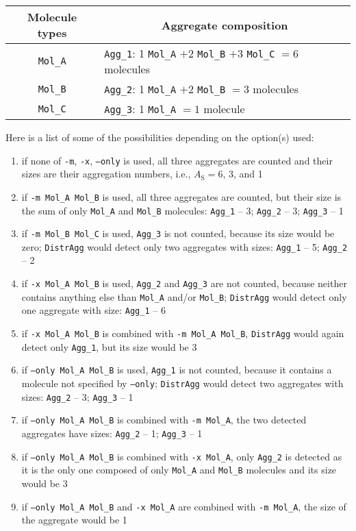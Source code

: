 \begin{longtable}{c|l}
  \toprule
  Molecule types & \multicolumn{1}{c}{Aggregate composition} \\
  \midrule
  \texttt{Mol\_A} & \texttt{Agg\_1}: 1 \texttt{Mol\_A} $+2$ \texttt{Mol\_B} $+3$ \texttt{Mol\_C} $=6$ molecules \\
  \texttt{Mol\_B} & \texttt{Agg\_2}: 1 \texttt{Mol\_A} $+2$ \texttt{Mol\_B} $=3$ molecules \\
  \texttt{Mol\_C} & \texttt{Agg\_3}: 1 \texttt{Mol\_A} $=1$ molecule \\
  \bottomrule
\end{longtable}

\noindent
Here is a list of some of the possibilities depending on the option(s)
used:
\begin{enumerate}[nosep]
  \item if none of \texttt{-m}, \texttt{-x}, \texttt{--only} is used, all
    three aggregates are counted and their sizes are their aggregation
    numbers, i.e., $A_{\mathrm{S}}=6$, 3, and 1
  \item if \texttt{-m Mol\_A Mol\_B} is used, all three aggregates are
    counted, but their size is the sum of only \texttt{Mol\_A} and
    \texttt{Mol\_B} molecules: \texttt{Agg\_1} -- 3; \texttt{Agg\_2} -- 3;
    \texttt{Agg\_3} -- 1
  \item if \texttt{-m Mol\_B Mol\_C} is used, \texttt{Agg\_3} is not
    counted, because its size would be zero; \texttt{DistrAgg} would detect
    only two aggregates with sizes: \texttt{Agg\_1} -- 5; \texttt{Agg\_2} --
    2
  \item if \texttt{-x Mol\_A Mol\_B} is used, \texttt{Agg\_2} and
    \texttt{Agg\_3} are not counted, because neither contains anything else
    than \texttt{Mol\_A} and/or \texttt{Mol\_B}; \texttt{DistrAgg} would
    detect only one aggregate with size: \texttt{Agg\_1} -- 6
  \item if \texttt{-x Mol\_A Mol\_B} is combined with \texttt{-m Mol\_A
    Mol\_B}, \texttt{DistrAgg} would again detect only \texttt{Agg\_1}, but
    its size would be 3
  \item if \texttt{--only Mol\_A Mol\_B} is used, \texttt{Agg\_1} is not
    counted, because it contains a molecule not specified by
    \texttt{--only}; \texttt{DistrAgg} would detect two aggregates
    with sizes: \texttt{Agg\_2} -- 3; \texttt{Agg\_3} -- 1
  \item if \texttt{--only Mol\_A Mol\_B} is combined with \texttt{-m
    Mol\_A}, the two detected aggregates have sizes: \texttt{Agg\_2} -- 1;
    \texttt{Agg\_3} -- 1
  \item if \texttt{--only Mol\_A Mol\_B} is combined with \texttt{-x
    Mol\_A}, only \texttt{Agg\_2} is detected as it is the only one composed of
    only \texttt{Mol\_A} and \texttt{Mol\_B} molecules and its size would
    be 3
  \item if \texttt{--only Mol\_A Mol\_B} and \texttt{-x Mol\_A} are combined
    with \texttt{-m Mol\_A}, the size of the aggregate would be 1
\end{enumerate}

